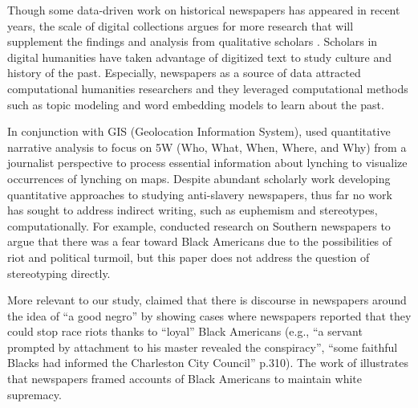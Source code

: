 \documentclass[11pt]{article}
\begin{document}
Though some data-driven work on historical newspapers has appeared in recent years, the scale of digital collections argues for more research that will supplement the findings and analysis from qualitative scholars \citep{gabrial2004melancholy,narayan_slavery_2020}. 
Scholars in digital humanities have taken advantage of digitized text to study culture \cite{griebel2024locating} and history of the past. 
Especially, newspapers as a source of data attracted computational humanities researchers and they leveraged computational methods \citep{park2023quantitative} such as topic modeling \cite{hengchen_data-driven_2021,klein_exploratory_2015} and word embedding models \cite{soni2021abolitionist} to learn about the past. 

In conjunction with GIS (Geolocation Information System), \citet{franzosi_ways_2012} used quantitative narrative analysis to focus on 5W (Who, What, When, Where, and Why) from a journalist perspective to process essential information about lynching to visualize occurrences of lynching on maps.
Despite abundant scholarly work developing quantitative approaches to studying anti-slavery newspapers, thus far no work has sought to address indirect writing, such as euphemism and stereotypes, computationally. 
For example, \citet{narayan_slavery_2020} conducted research on Southern newspapers to argue that there was a fear toward Black Americans due to the possibilities of riot and political turmoil, but this paper does not address the question of stereotyping directly. 

More relevant to our study, \citet{gabrial2004melancholy} claimed that there is discourse in newspapers around the idea of ``a good negro'' by showing cases where newspapers reported that they could stop race riots thanks to ``loyal'' Black Americans (e.g., ``a servant prompted by attachment to his master revealed the conspiracy'', ``some faithful Blacks had informed the Charleston City Council'' p.310). 
The work of \citet{gabrial2004melancholy} illustrates that newspapers framed accounts of Black Americans to maintain white supremacy.
\end{document}
